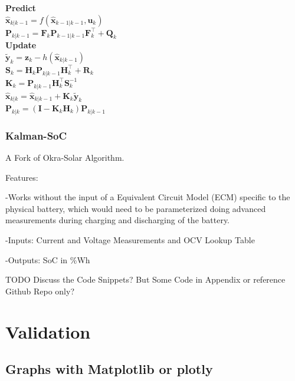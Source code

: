 \textbf{Predict} \\
${\displaystyle {\hat {\boldsymbol {x}}}_{k|k-1}=f({\hat {\boldsymbol {x}}}_{k-1|k-1},{\boldsymbol {u}}_{k})} $ \\
${\displaystyle {\boldsymbol {P}}_{k|k-1}={{\boldsymbol {F}}_{k}}{\boldsymbol {P}}_{k-1|k-1}{{\boldsymbol {F}}_{k}^{\top }}+{\boldsymbol {Q}}_{k}}$ \\

\textbf{Update} \\
${\tilde  {{\boldsymbol  {y}}}}_{{k}}={\boldsymbol  {z}}_{{k}}-h({\hat  {{\boldsymbol  {x}}}}_{{k|k-1}})$ \\
${\boldsymbol  {S}}_{{k}}={{{\boldsymbol  {H}}_{{k}}}}{\boldsymbol  {P}}_{{k|k-1}}{{{\boldsymbol  {H}}_{{k}}^{\top }}}+{\boldsymbol  {R}}_{{k}}$ \\
${\boldsymbol  {K}}_{{k}}={\boldsymbol  {P}}_{{k|k-1}}{{{\boldsymbol  {H}}_{{k}}^{\top }}}{\boldsymbol  {S}}_{{k}}^{{-1}}$ \\
${\hat  {{\boldsymbol  {x}}}}_{{k|k}}={\hat  {{\boldsymbol  {x}}}}_{{k|k-1}}+{\boldsymbol  {K}}_{{k}}{\tilde  {{\boldsymbol  {y}}}}_{{k}}$ \\
${\boldsymbol  {P}}_{{k|k}}=({\boldsymbol  {I}}-{\boldsymbol  {K}}_{{k}}{{{\boldsymbol  {H}}_{{k}}}}){\boldsymbol  {P}}_{{k|k-1}}$ \\




\subsection{Kalman-SoC}
A Fork of Okra-Solar Algorithm. \

Features: \

-Works without the input of a Equivalent Circuit Model (ECM) specific to the physical battery, which would need to be parameterized doing advanced measurements during charging and discharging of the battery. 

-Inputs: Current and Voltage Measurements and OCV Lookup Table

-Outputs: SoC in \%Wh

TODO Discuss the Code Snippets? But Some Code in Appendix or reference Github Repo only? 
\chapter{Validation}


\section{Graphs with Matplotlib or plotly}

